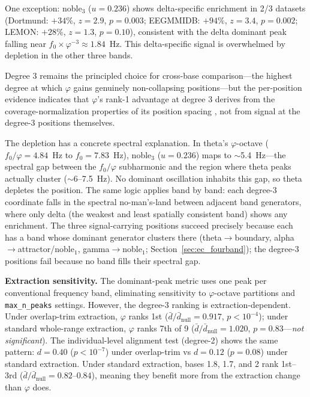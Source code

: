 \documentclass[11pt,a4paper]{article}
\newcommand{\phisym}{\varphi}
\newcommand{\fzero}{f_0}
\begin{document}
One exception: noble$_3$ ($u = 0.236$) shows delta-specific enrichment in 2/3 datasets (Dortmund: $+34\%$, $z = 2.9$, $p = 0.003$; EEGMMIDB: $+94\%$, $z = 3.4$, $p = 0.002$; LEMON: $+28\%$, $z = 1.3$, $p = 0.10$), consistent with the delta dominant peak falling near $f_0 \times \phisym^{-3} \approx 1.84$~Hz. This delta-specific signal is overwhelmed by depletion in the other three bands.

Degree 3 remains the principled choice for cross-base comparison---the highest degree at which $\phisym$ gains genuinely non-collapsing positions---but the per-position evidence indicates that $\phisym$'s rank-1 advantage at degree 3 derives from the coverage-normalization properties of its position spacing \parencite{Slater1967}, not from signal at the degree-3 positions themselves.

The depletion has a concrete spectral explanation. In theta's $\phisym$-octave ($\fzero/\phisym = 4.84$~Hz to $\fzero = 7.83$~Hz), noble$_3$ ($u = 0.236$) maps to $\sim$5.4~Hz---the spectral gap between the $\fzero/\phisym$ subharmonic and the region where theta peaks actually cluster ($\sim$6--7.5~Hz). No dominant oscillation inhabits this gap, so theta depletes the position. The same logic applies band by band: each degree-3 coordinate falls in the spectral no-man's-land between adjacent band generators, where only delta (the weakest and least spatially consistent band) shows any enrichment. The three signal-carrying positions succeed precisely because each has a band whose dominant generator clusters there (theta$\to$boundary, alpha$\to$attractor/noble$_1$, gamma$\to$noble$_1$; Section~\ref{sec:ec_fourband}); the degree-3 positions fail because no band fills their spectral gap.

\textbf{Extraction sensitivity.} The dominant-peak metric uses one peak per conventional frequency band, eliminating sensitivity to $\phisym$-octave partitions and \texttt{max\_n\_peaks} settings. However, the degree-3 ranking is extraction-dependent. Under overlap-trim extraction, $\phisym$ ranks 1st ($\bar{d}/\bar{d}_{\text{null}} = 0.917$, $p < 10^{-4}$); under standard whole-range extraction, $\phisym$ ranks 7th of 9 ($\bar{d}/\bar{d}_{\text{null}} = 1.020$, $p = 0.83$---\textit{not significant}). The individual-level alignment test (degree-2) shows the same pattern: $d = 0.40$ ($p < 10^{-7}$) under overlap-trim vs $d = 0.12$ ($p = 0.08$) under standard extraction. Under standard extraction, bases 1.8, 1.7, and 2 rank 1st--3rd ($\bar{d}/\bar{d}_{\text{null}} = 0.82$--$0.84$), meaning they benefit more from the extraction change than $\phisym$ does.
\end{document}
